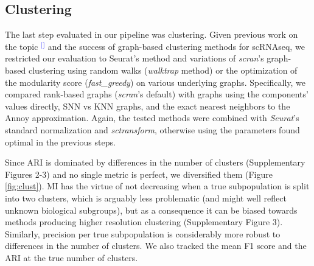 \documentclass[11pt]{article}
\renewcommand{\cite}[1]{\textcolor{Blue}{$^[$\supercite{#1}$^]$}}
\begin{document}
\subsection*{Clustering}

The last step evaluated in our pipeline was clustering. Given previous work on the topic \cite{duoClustering2018,freytagComparison2018} and the success of graph-based clustering methods for scRNAseq, we restricted our evaluation to Seurat's method and variations of \textit{scran}'s graph-based clustering using random walks (\textit{walktrap} method) or the optimization of the modularity score (\textit{fast\_greedy}) on various underlying graphs. Specifically, we compared rank-based graphs (\textit{scran}'s default) with graphs using the components' values directly, SNN vs KNN graphs, and the exact nearest neighbors to the Annoy approximation. Again, the tested methods were combined with \textit{Seurat}'s standard normalization and \textit{sctransform}, otherwise using the parameters found optimal in the previous steps. 

Since ARI is dominated by differences in the number of clusters (Supplementary Figures 2-3) and no single metric is perfect, we diversified them (Figure \ref{fig:clust}). MI has the virtue of not decreasing when a true subpopulation is split into two clusters, which is arguably less problematic (and might well reflect unknown biological subgroups), but as a consequence it can be biased towards methods producing higher resolution clustering (Supplementary Figure 3). Similarly, precision per true subpopulation is considerably more robust to differences in the number of clusters. We also tracked the mean F1 score and the ARI at the true number of clusters. 
\end{document}
